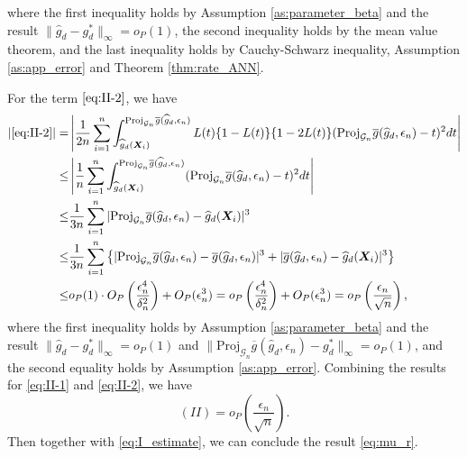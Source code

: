 \documentclass[11pt]{article}
\numberwithin{equation}{section}
\begin{document}
where the first inequality holds by Assumption \ref{as:parameter_beta} and the result $\|\widehat{g}_d-g_d^*\|_{\infty}=o_P(1)$, the second inequality holds by the mean value theorem, and the last inequality holds by Cauchy-Schwarz inequality, Assumption \ref{as:app_error} and Theorem \ref{thm:rate_ANN}.

For the term $\eqref{eq:II-2}$, we have
\begin{align*}
	|\eqref{eq:II-2}|=&\left|\frac{1}{2n}\sum_{i=1}^n\int_{\widehat{g}_d(\boldsymbol{X}_i)}^{\text{Proj}_{\mathcal{G}_n}\overline{g}(\widehat{g}_d,\epsilon_n)}L(t)\{1-L(t)\}\{1-2L(t)\}(\text{Proj}_{\mathcal{G}_n}\overline{g}(\widehat{g}_d,\epsilon_n)-t)^2dt\right|\\
	\leq&   \left|\frac{1}{n}\sum_{i=1}^n\int_{\widehat{g}_d(\boldsymbol{X}_i)}^{\text{Proj}_{\mathcal{G}_n}\overline{g}(\widehat{g}_d,\epsilon_n)}(\text{Proj}_{\mathcal{G}_n}\overline{g}(\widehat{g}_d,\epsilon_n)-t)^2dt\right|\\
	\leq &   \frac{1}{3n}\sum_{i=1}^n|\text{Proj}_{\mathcal{G}_n}\overline{g}(\widehat{g}_d,\epsilon_n)-\widehat{g}_d(\boldsymbol{X}_i)|^3\\
	\leq &  \frac{1}{3n}\sum_{i=1}^n\left\{|\text{Proj}_{\mathcal{G}_n}\overline{g}(\widehat{g}_d,\epsilon_n)-\overline{g}(\widehat{g}_d,\epsilon_n)|^3+|\overline{g}(\widehat{g}_d,\epsilon_n)-\widehat{g}_d(\boldsymbol{X}_i)|^3\right\}\\
	\leq &o_P(1)\cdot O_P\left(\frac{\epsilon_n^4}{\delta_n^2}\right) +O_P(\epsilon_n^3)=o_P\left(\frac{\epsilon_n^4}{\delta_n^2}\right)+O_P(\epsilon_n^3)=o_P\left(\frac{\epsilon_n}{\sqrt{n}}\right),
\end{align*}
where the first inequality holds by  Assumption \ref{as:parameter_beta} and the result $\|\widehat{g}_d-g_d^*\|_{\infty}=o_P(1)$ and $\|\text{Proj}_{\mathcal{G}_n}\overline{g}(\widehat{g}_d,\epsilon_n)-g_d^*\|_{\infty}=o_P(1)$, and the second equality holds by Assumption \ref{as:app_error}. Combining the results for \eqref{eq:II-1} and \eqref{eq:II-2}, we have
$$(II)=o_P\left(\frac{\epsilon_n}{\sqrt{n}}\right).$$
Then together with \eqref{eq:I_estimate}, we can conclude the result \eqref{eq:mu_r}.

\end{document}
